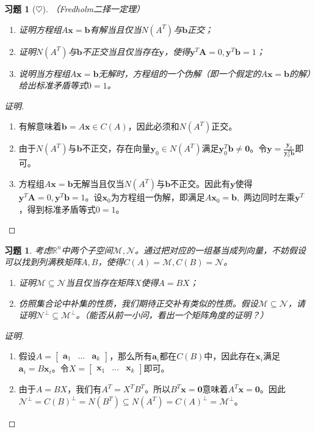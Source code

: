 \documentclass[UTF8]{ctexart}
\newcommand{\Ker}{N}
\newtheorem{ex}[thm]{习题}
\begin{document}
\begin{ex}[$\heartsuit$]
（Fredholm二择一定理）
\begin{enumerate}
\item 证明方程组$A\bm x=\bm b$有解当且仅当$\Ker(A^T)$与$\bm b$正交；
\item 证明$\Ker(A^T)$与$\bm b$不正交当且仅当存在$\bm y$，使得$\bm y^T \bm A =0, \bm y^T \bm b =1$；
\item 说明当方程组$A\bm x=\bm b$无解时，方程组的一个伪解（即一个假定的$A\bm x=\bm b$的解）给出标准矛盾等式$0=1$。

\end{enumerate}
\end{ex}

\begin{proof}[证明]
\begin{enumerate}
\item 有解意味着$\bm b=A\bm x\in C(A)$，因此必须和$\Ker(A^T)$正交。
\item 由于$\Ker(A^T)$与$\bm b$不正交，存在向量$\bm y_0\in\Ker(A^T)$满足$\bm y_0^T\bm b\neq \bm 0$。令$\bm y=\frac{\bm y_0}{\bm y_0^T\bm b}$即可。
\item  方程组$A\bm x=\bm b$无解当且仅当$\Ker(A^T)$与$\bm b$不正交。因此有$\bm y$使得$\bm y^T \bm A =0, \bm y^T \bm b =1$。设$\bm x_0$为方程组一伪解，即满足$A\bm x_0=\bm b,$ 两边同时左乘$\bm y^T$，得到标准矛盾等式$0=1$。
\end{enumerate}
\end{proof}




\begin{ex}
考虑$\mathbb{R}^n$中两个子空间$\mathcal{M},\mathcal{N}$。通过把对应的一组基当成列向量，不妨假设可以找到列满秩矩阵$A,B$，使得$C(A)=\mathcal{M}, C(B)=\mathcal{N}$。
\begin{enumerate}
\item 证明$\mathcal{M}\subseteq\mathcal{N}$当且仅当存在矩阵$X$使得$A=BX$；
\item 仿照集合论中补集的性质，我们期待正交补有类似的性质。假设$\mathcal{M}\subseteq\mathcal{N}$，请证明$\mathcal{N}^\perp\subseteq\mathcal{M}^\perp$。（能否从前一小问，看出一个矩阵角度的证明？）
\end{enumerate}
\end{ex}



\begin{proof}[证明]
\begin{enumerate}
\item 假设$A=\begin{bmatrix}\bm a_1&\dots&\bm a_k\end{bmatrix}$，那么所有$\bm a_i$都在$C(B)$中，因此存在$\bm x_i$满足$\bm a_i=B\bm x_i$。令$X=\begin{bmatrix}\bm x_1&\dots&\bm x_k\end{bmatrix}$即可。
\item 由于$A=BX$，我们有$A^T=X^TB^T$。所以$B^T\bm x=\bm 0$意味着$A^T\bm x=\bm 0$。因此$\mathcal{N}^\perp= C(B)^\perp=\Ker(B^T)\subseteq\Ker(A^T)= C(A)^\perp=\mathcal{M}^\perp$。
\end{enumerate}
\end{proof}
\end{document}
